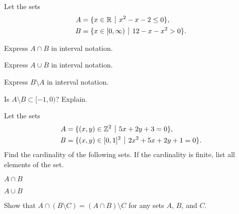 \begin{problem}
    Let the sets
    \begin{align*}
        A &= \{x \in \R \vert x^2 - x - 2 \leq 0\},\\
        B &= \{x \in [0, \infty) \vert 12 - x - x^2 > 0\}.
    \end{align*}
    \begin{partquestions}{\alph*}
        \item Express $A \cap B$ in interval notation.
        \item Express $A \cup B$ in interval notation.
        \item Express $B \setminus A$ in interval notation.
        \item Is $A \setminus B \subset [-1, 0)$? Explain.
    \end{partquestions}
\end{problem}

\begin{problem}
    Let the sets
    \begin{align*}
        A &= \{(x,y) \in \Z^2 \vert 5x+2y+3=0\},\\
        B &= \{(x,y) \in [0,1]^2 \vert 2x^2+5x+2y+1=0\}.
    \end{align*}
    Find the cardinality of the following sets. If the cardinality is finite, list all elements of the set.
    \begin{partquestions}{\alph*}
        \item $A \cap B$
        \item $A \cup B$
    \end{partquestions}
\end{problem}

\begin{problem}
    Show that $A \cap (B \setminus C) = (A \cap B) \setminus C$ for any sets $A$, $B$, and $C$.
\end{problem}
